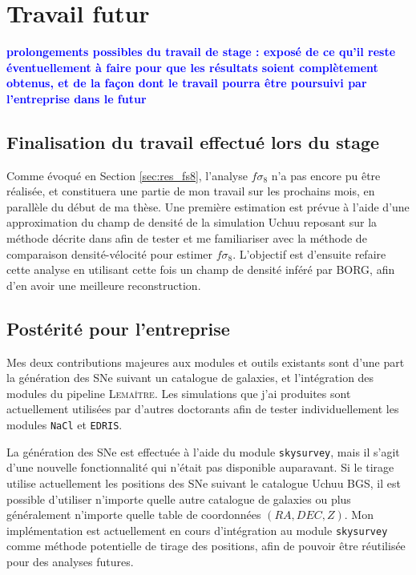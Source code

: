 \documentclass{book}
\newcommand{\consignes}[1]{{\textcolor{blue}{\bf \large #1}}}
\def\lemaitre{\textsc{Lemaître}\xspace}
\def\skysurvey{\texttt{skysurvey}\xspace}
\def\nacl{\texttt{NaCl}\xspace}
\def\edris{\texttt{EDRIS}\xspace}
\begin{document}
\chapter{Travail futur}
\consignes{prolongements possibles du travail de stage : exposé de ce qu’il reste éventuellement à faire pour que les résultats soient complètement obtenus, et de la façon dont le travail pourra être poursuivi par l’entreprise dans le futur}

\section{Finalisation du travail effectué lors du stage}

Comme évoqué en Section \ref{sec:res_fs8}, l'analyse $f\sigma_8$ n'a pas encore pu être réalisée, et constituera une partie de mon travail sur les prochains mois, en parallèle du début de ma thèse. Une première estimation est prévue à l'aide d'une approximation du champ de densité de la simulation Uchuu reposant sur la méthode décrite dans \cite{carrick_cosmological_2015} afin de tester et me familiariser avec la méthode de comparaison densité-vélocité pour estimer $f\sigma_8$. L'objectif est d'ensuite refaire cette analyse en utilisant cette fois un champ de densité inféré par BORG, afin d'en avoir une meilleure reconstruction.
 
\section{Postérité pour l'entreprise}

Mes deux contributions majeures aux modules et outils existants sont d'une part la génération des SNe suivant un catalogue de galaxies, et l'intégration des modules du pipeline \lemaitre. Les simulations que j'ai produites sont actuellement utilisées par d'autres doctorants afin de tester individuellement les modules \nacl et \edris.

La génération des SNe est effectuée à l'aide du module \skysurvey, mais il s'agit d'une nouvelle fonctionnalité qui n'était pas disponible auparavant. Si le tirage utilise actuellement les positions des SNe suivant le catalogue Uchuu BGS, il est possible d'utiliser n'importe quelle autre catalogue de galaxies ou plus généralement n'importe quelle table de coordonnées $(RA,DEC,Z)$. Mon implémentation est actuellement en cours d'intégration au module \skysurvey comme méthode potentielle de tirage des positions, afin de pouvoir être réutilisée pour des analyses futures.
\end{document}
